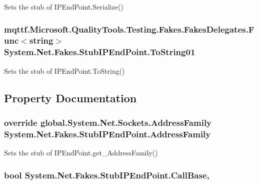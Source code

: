 Sets the stub of I\-P\-End\-Point.\-Serialize()

\hypertarget{class_system_1_1_net_1_1_fakes_1_1_stub_i_p_end_point_aff9f3387089c89a61eb21f322878601b}{
\subsubsection[{To\-String01}]{\setlength{\rightskip}{0pt plus 5cm}mqttf.\-Microsoft.\-Quality\-Tools.\-Testing.\-Fakes.\-Fakes\-Delegates.\-Func$<$string$>$ System.\-Net.\-Fakes.\-Stub\-I\-P\-End\-Point.\-To\-String01}}\label{class_system_1_1_net_1_1_fakes_1_1_stub_i_p_end_point_aff9f3387089c89a61eb21f322878601b}


Sets the stub of I\-P\-End\-Point.\-To\-String()



\subsection{Property Documentation}
\hypertarget{class_system_1_1_net_1_1_fakes_1_1_stub_i_p_end_point_aaf16d73ecc12baaac2f88b1ca6d937d1}{
\subsubsection[{Address\-Family}]{\setlength{\rightskip}{0pt plus 5cm}override global.\-System.\-Net.\-Sockets.\-Address\-Family System.\-Net.\-Fakes.\-Stub\-I\-P\-End\-Point.\-Address\-Family\hspace{0.3cm}{\ttfamily [get]}}}\label{class_system_1_1_net_1_1_fakes_1_1_stub_i_p_end_point_aaf16d73ecc12baaac2f88b1ca6d937d1}


Sets the stub of I\-P\-End\-Point.\-get\-\_\-\-Address\-Family()

\hypertarget{class_system_1_1_net_1_1_fakes_1_1_stub_i_p_end_point_a7933f420054416c267a29bbfa5c81928}{
\subsubsection[{Call\-Base}]{\setlength{\rightskip}{0pt plus 5cm}bool System.\-Net.\-Fakes.\-Stub\-I\-P\-End\-Point.\-Call\-Base\hspace{0.3cm}{\ttfamily [get]}, {\ttfamily [set]}}}\label{class_system_1_1_net_1_1_fakes_1_1_stub_i_p_end_point_a7933f420054416c267a29bbfa5c81928}


